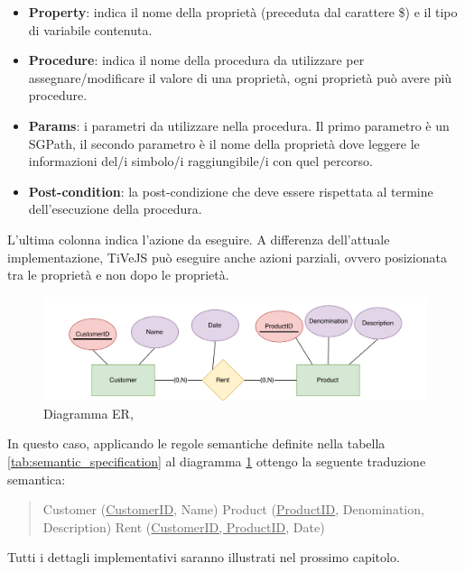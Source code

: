         \begin{itemize}
            \item \textbf{Property}: indica il nome della proprietà (preceduta dal carattere \$) e il tipo di variabile contenuta.
            \item \textbf{Procedure}: indica il nome della procedura da utilizzare per assegnare/modificare il valore di una proprietà, ogni proprietà può avere più procedure.
            \item \textbf{Params}: i parametri da utilizzare nella procedura. Il primo parametro è un SGPath, il secondo parametro è il nome della proprietà dove leggere le informazioni del/i simbolo/i raggiungibile/i con quel percorso.
            \item \textbf{Post-condition}: la post-condizione che deve essere rispettata al termine dell'esecuzione della procedura. 
        \end{itemize}
        L'ultima colonna indica l'azione da eseguire. A differenza dell'attuale implementazione, TiVeJS può eseguire anche azioni parziali, ovvero posizionata tra le proprietà e non dopo le proprietà.
        \newline
        \begin{figure}[htbp]
            \centering
            \includegraphics[scale=0.4]{Figure/er_diagram.PNG}
            \caption{Diagramma ER, \cite{localcontext}}
            \label{fig:er_diagram}
        \end{figure}
        In questo caso, applicando le regole semantiche definite nella tabella \ref{tab:semantic_specification} al diagramma \ref{fig:er_diagram} ottengo la seguente traduzione semantica:
        \begin{quotation}
            \noindent
            Customer (\underline{CustomerID}, Name) \newline
            Product (\underline{ProductID}, Denomination, Description) \newline
            Rent (\underline{CustomerID, ProductID}, Date)
        \end{quotation}
        Tutti i dettagli implementativi saranno illustrati nel prossimo capitolo.